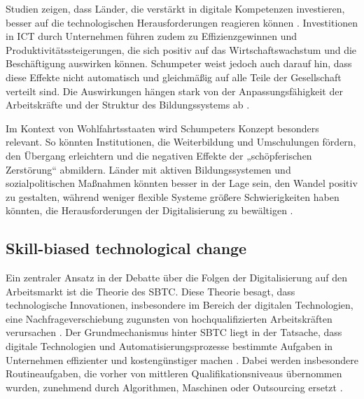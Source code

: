 Studien zeigen, dass Länder, die verstärkt in digitale Kompetenzen investieren, besser auf 
die technologischen Herausforderungen reagieren können 
\parencite[S. 15–17]{oecd2019measuring}. Investitionen in \ac{ICT} durch Unternehmen führen 
zudem zu Effizienzgewinnen und Produktivitätssteigerungen, die sich positiv auf das 
Wirtschaftswachstum und die Beschäftigung auswirken können. Schumpeter weist jedoch auch 
darauf hin, dass diese Effekte nicht automatisch und gleichmäßig auf alle Teile der 
Gesellschaft verteilt sind. Die Auswirkungen hängen stark von der Anpassungsfähigkeit der 
Arbeitskräfte und der Struktur des Bildungssystems ab \parencite[S. 48]{oecd2019measuring}.

Im Kontext von Wohlfahrtsstaaten wird Schumpeters Konzept besonders relevant. So könnten 
Institutionen, die Weiterbildung und Umschulungen fördern, den Übergang erleichtern und die 
negativen Effekte der „schöpferischen Zerstörung“ abmildern. Länder mit aktiven 
Bildungssystemen und sozialpolitischen Maßnahmen könnten besser in der Lage sein, den 
Wandel positiv zu gestalten, während weniger flexible Systeme größere Schwierigkeiten haben 
könnten, die Herausforderungen der Digitalisierung zu bewältigen 
\parencite[vgl.][S. 29–31]{espingandersen1990thethree}.


\subsection{Skill-biased technological change}

Ein zentraler Ansatz in der Debatte über die Folgen der Digitalisierung auf den 
Arbeitsmarkt ist die Theorie des \ac{SBTC}. Diese Theorie besagt, dass technologische 
Innovationen, insbesondere im Bereich der digitalen Technologien, eine 
Nachfrageverschiebung zugunsten von hochqualifizierten Arbeitskräften verursachen 
\parencite[vgl.][S. 1]{violante2008skill}. Der Grundmechanismus hinter \ac{SBTC} 
liegt in der Tatsache, dass digitale Technologien und Automatisierungsprozesse bestimmte 
Aufgaben in Unternehmen effizienter und kostengünstiger machen 
\parencite[vgl.][S. 2–3]{violante2008skill}. Dabei werden insbesondere 
Routineaufgaben, die vorher von mittleren Qualifikationsniveaus übernommen wurden, 
zunehmend durch Algorithmen, Maschinen oder Outsourcing ersetzt
\parencite[vgl.][S. 1279]{autor2003theskill}.

